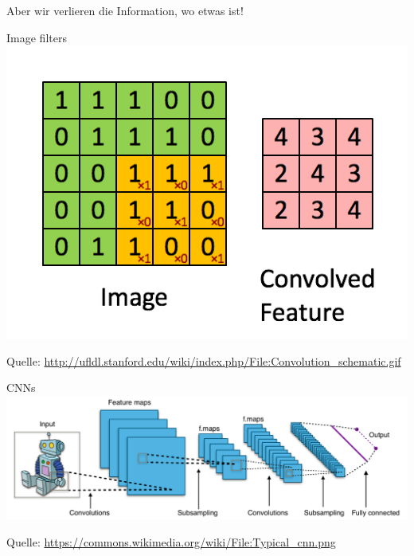 \begin{frame}{}
    \begin{center}
        \Huge Aber wir verlieren die Information, wo etwas ist!

    \end{center}
\end{frame}


\begin{frame}{Image filters}
    \includegraphics[width=\textwidth, height=0.8\textheight, keepaspectratio]{../presentation-images/image-filter-8.png}

    Quelle: \href{http://ufldl.stanford.edu/wiki/index.php/File:Convolution_schematic.gif}{http://ufldl.stanford.edu/wiki/index.php/File:Convolution\_schematic.gif}
\end{frame}


\begin{frame}{CNNs}
    \includegraphics[width=\textwidth, height=0.8\textheight, keepaspectratio]{../presentation-images/Typical-cnn.png}

    Quelle: \href{https://commons.wikimedia.org/wiki/File:Typical_cnn.png}{https://commons.wikimedia.org/wiki/File:Typical\_cnn.png}
\end{frame}

